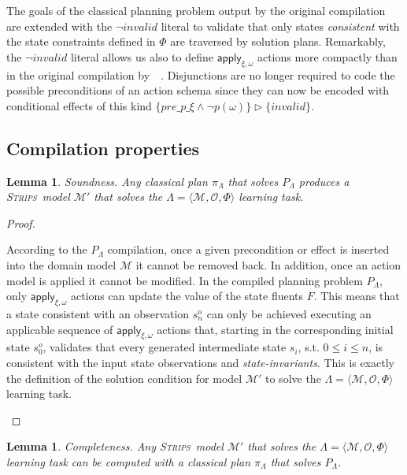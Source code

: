 \documentclass{article}
\newcommand{\tup}[1]{{\langle #1 \rangle}}
\newcommand{\strips}{\textsc{Strips}}
\newtheorem{mylemma}[mytheorem]{Lemma}
\begin{document}
The goals of the classical planning problem output by the original compilation are extended with the $\neg invalid$ literal to validate that only states {\em consistent} with the state constraints defined in $\Phi$ are traversed by solution plans. Remarkably, the $\neg invalid$ literal allows us also to define $\mathsf{apply_{\xi,\omega}}$ actions more compactly than in the original compilation by~\citeauthor{aineto2018learning}~\citeyear{aineto2018learning}. Disjunctions are no longer required to code the possible preconditions of an action schema since they can now be encoded with conditional effects of this kind $\{pre\_p\_\xi\wedge \neg p(\omega)\}\rhd\{invalid\}$.

\subsection{Compilation properties}
\begin{mylemma}
Soundness. Any classical plan $\pi_{\Lambda}$ that solves $P_{\Lambda}$ produces a \strips\ model $\mathcal{M'}$ that solves the $\Lambda=\tup{\mathcal{M},{\mathcal O},\Phi}$ learning task.
\end{mylemma}

\begin{proof}[Proof]
\begin{small}
According to the $P_{\Lambda}$ compilation, once a given precondition or effect is inserted into the domain model $\mathcal{M}$ it cannot be removed back. In addition, once an action model is applied it cannot be modified. In the compiled planning problem $P_{\Lambda}$, only $\mathsf{apply_{\xi,\omega}}$ actions can update the value of the state fluents $F$. This means that a state consistent with an observation $s_n^o$ can only be achieved executing an applicable sequence of $\mathsf{apply_{\xi,\omega}}$ actions that, starting in the corresponding initial state $s_0^o$, validates that every generated intermediate state $s_i$, s.t. $0\leq i\leq n$, is consistent with the input state observations and {\em state-invariants}. This is exactly the definition of the solution condition for model $\mathcal{M}'$ to solve the $\Lambda=\tup{\mathcal{M},{\mathcal O},\Phi}$ learning task.
\end{small}
\end{proof}

\begin{mylemma}
Completeness. Any \strips\ model $\mathcal{M}'$ that solves the $\Lambda=\tup{\mathcal{M},{\mathcal O},\Phi}$ learning task can be computed with a classical plan $\pi_{\Lambda}$ that solves $P_{\Lambda}$.
\end{mylemma}
\end{document}
